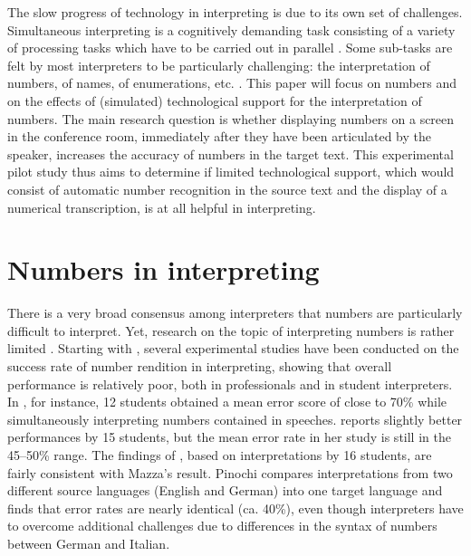 \documentclass[output=paper]{langsci/langscibook}
\begin{document}
The slow progress of technology in interpreting is due to its own set of challenges. Simultaneous interpreting is a cognitively demanding task consisting of a variety of processing tasks which have to be carried out in parallel \citep{Gile1995, Seeber2011a}. Some sub-tasks are felt by most interpreters to be particularly challenging: the interpretation of numbers, of names, of enumerations, etc. \citep{Gile2009}. This paper will focus on numbers and on the effects of (simulated) technological support for the interpretation of numbers. The main research question is whether displaying numbers on a screen in the conference room, immediately after they have been articulated by the speaker, increases the accuracy of numbers in the target text. This experimental pilot study thus aims to determine if limited technological support, which would consist of automatic number recognition in the source text and the display of a numerical transcription, is at all helpful in interpreting.

\section{Numbers in interpreting}

There is a very broad consensus among interpreters that numbers are particularly difficult to interpret. Yet, research on the topic of interpreting numbers is rather limited \citep[287]{Mead2015}. Starting with \citet{Braun1996}, several experimental studies have been conducted on the success rate of number rendition in interpreting, showing that overall performance is relatively poor, both in professionals and in student interpreters. In \citet{Braun1996}, for instance, 12 students obtained a mean error score of close to 70\% while simultaneously interpreting numbers contained in speeches. \citet{Mazza2001} reports slightly better performances by 15 students, but the mean error rate in her study is still in the 45--50\% range. The findings of \citet{Pinochi2009}, based on interpretations by 16 students, are fairly consistent with Mazza’s result. Pinochi compares interpretations from two different source languages (English and German) into one target language and finds that error rates are nearly identical (ca. 40\%), even though interpreters have to overcome additional challenges due to differences in the syntax of numbers between German and Italian.
\end{document}

